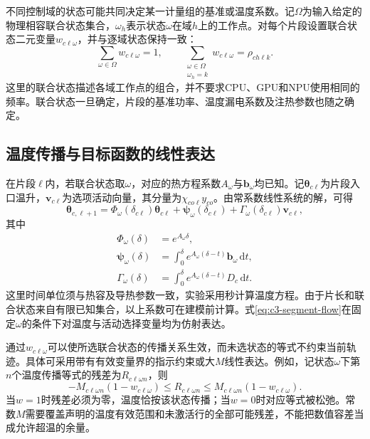 不同控制域的状态可能共同决定某一计量组的基准或温度系数。记$\Omega$为输入给定的物理相容联合状态集合，$\omega_h$表示状态$\omega$在域$h$上的工作点。对每个片段设置联合状态二元变量$w_{c\ell\omega}$，并与逐域状态保持一致：
\begin{equation}
 \sum_{\omega\in\Omega}w_{c\ell\omega}=1,\qquad
 \sum_{\substack{\omega\in\Omega\\\omega_h=k}}
 w_{c\ell\omega}=\rho_{ch\ell k}.
 \label{eq:c3-combined}
\end{equation}
这里的联合状态描述各域工作点的组合，并不要求CPU、GPU和NPU使用相同的频率。联合状态一旦确定，片段的基准功率、温度漏电系数及注热参数也随之确定。

\subsection{温度传播与目标函数的线性表达}

在片段$\ell$内，若联合状态取$\omega$，对应的热方程系数$A_\omega$与$\boldsymbol b_\omega$均已知。记$\boldsymbol\theta_{c\ell}$为片段入口温升，$\boldsymbol v_{c\ell}$为选项活动向量，其分量为$\chi_{co\ell}y_{co}$。由常系数线性系统的解，可得
\begin{equation}
 \boldsymbol\theta_{c,\ell+1}
 =\Phi_{\omega}(\delta_{c\ell})\boldsymbol\theta_{c\ell}
  +\boldsymbol\psi_{\omega}(\delta_{c\ell})
  +\Gamma_{\omega}(\delta_{c\ell})\boldsymbol v_{c\ell},
 \label{eq:c3-segment-flow}
\end{equation}
其中
\begin{equation}
 \begin{aligned}
 \Phi_{\omega}(\delta)&=e^{A_\omega\delta},\\
 \boldsymbol\psi_{\omega}(\delta)
  &=\int_0^\delta e^{A_\omega(\delta-t)}
                         \boldsymbol b_\omega\,\mathrm dt,\\
 \Gamma_{\omega}(\delta)
  &=\int_0^\delta e^{A_\omega(\delta-t)}
                         D_c\,\mathrm dt.
 \end{aligned}
 \label{eq:c3-segment-coeff}
\end{equation}
这里时间单位须与热容及导热参数一致，实验采用秒计算温度方程。由于片长和联合状态来自有限已知集合，以上系数可在建模前计算。式\eqref{eq:c3-segment-flow}在固定$\omega$的条件下对温度与活动选择变量均为仿射表达。

通过$w_{c\ell\omega}$可以使所选联合状态的传播关系生效，而未选状态的等式不约束当前轨迹。具体可采用带有有效变量界的指示约束或大$M$线性表达。例如，记状态$\omega$下第$n$个温度传播等式的残差为$R_{c\ell\omega n}$，则
\begin{equation}
 -M_{c\ell\omega n}(1-w_{c\ell\omega})
 \le R_{c\ell\omega n}
 \le M_{c\ell\omega n}(1-w_{c\ell\omega}).
 \label{eq:c3-bigM}
\end{equation}
当$w=1$时残差必须为零，温度恰按该状态传播；当$w=0$时对应等式被松弛。常数$M$需要覆盖声明的温度有效范围和未激活行的全部可能残差，不能把数值容差当成允许超温的余量。


